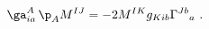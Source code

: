 \begin{equation} \label{gammadM}
  \ga^A_{ia}\, \p_A M^{IJ} = -2 M^{IK} g_{Kib} \Gamma^{Jb}{}_a\ .
 \end{equation}

